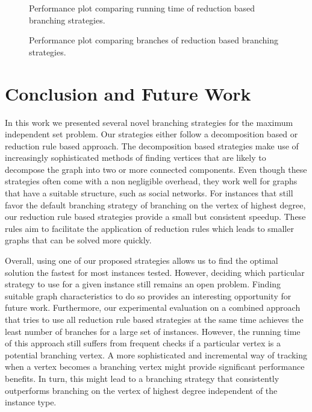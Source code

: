 \documentclass[a4paper,UKenglish,cleveref, autoref, thm-restate]{lipics-v2021}
\begin{document}

\begin{figure}[t]
	\centering
	
	\caption{Performance plot comparing running time of reduction based branching strategies.}
	\label{fig:all_reduction_time}
\end{figure}

\begin{figure}[t]
	\centering
	
	\caption{Performance plot comparing branches of reduction based branching strategies.}
	\label{fig:all_reduction_branch}
\end{figure}


\section{Conclusion and Future Work}
In this work we presented several novel branching strategies for the maximum independent set problem.
Our strategies either follow a decomposition based or reduction rule based approach.
The decomposition based strategies make use of increasingly sophisticated methods of finding vertices that are likely to decompose the graph into two or more connected components.
Even though these strategies often come with a non negligible overhead, they work well for graphs that have a suitable structure, such as social networks.
For instances that still favor the default branching strategy of branching on the vertex of highest degree, our reduction rule based strategies provide a small but consistent speedup.
These rules aim to facilitate the application of reduction rules which leads to smaller graphs that can be solved more quickly.

Overall, using one of our proposed strategies allows us to find the optimal solution the fastest for most instances tested.
However, deciding which particular strategy to use for a given instance still remains an open problem.
Finding suitable graph characteristics to do so provides an interesting opportunity for future work.
Furthermore, our experimental evaluation on a combined approach that tries to use all reduction rule based strategies at the same time achieves the least number of branches for a large set of instances.
However, the running time of this approach still suffers from frequent checks if a particular vertex is a potential branching vertex.
A more sophisticated and incremental way of tracking when a vertex becomes a branching vertex might provide significant performance benefits.
In turn, this might lead to a branching strategy that consistently outperforms branching on the vertex of highest degree independent of the instance type.
\end{document}
